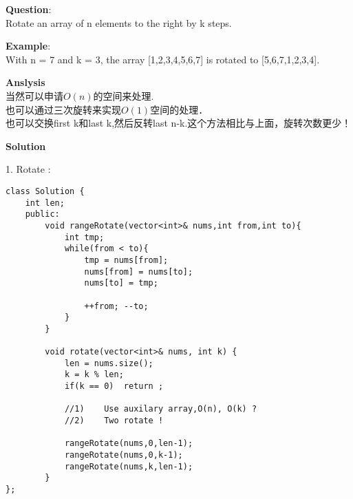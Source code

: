 \begin{description}
    \item{\textbf{Question}}:\\%
		Rotate an array of n elements to the right by k steps.\\

    \item{\textbf{Example}}:\\%
		With n = 7 and k = 3, the array [1,2,3,4,5,6,7] is rotated to [5,6,7,1,2,3,4].\\

    \item{\textbf{Anslysis}}\\
		当然可以申请$O(n)$的空间来处理.\\
		也可以通过三次旋转来实现$O(1)$空间的处理．\\
		也可以交换first k和last k,然后反转last n-k.这个方法相比与上面，旋转次数更少！\\

    \item{\textbf{Solution}}\\
	\item{1. Rotate} : \\
		\begin{lstlisting}
class Solution {
	int len;
	public:
		void rangeRotate(vector<int>& nums,int from,int to){
			int tmp;
			while(from < to){
				tmp = nums[from];
				nums[from] = nums[to];
				nums[to] = tmp;

				++from;	--to;
			}
		}

		void rotate(vector<int>& nums, int k) {
			len = nums.size();
			k = k % len;
			if(k == 0)	return ;

			//1)	Use auxilary array,O(n), O(k) ?
			//2)	Two rotate !

			rangeRotate(nums,0,len-1);
			rangeRotate(nums,0,k-1);
			rangeRotate(nums,k,len-1);
		}
};		
		\end{lstlisting}
\end{description}

